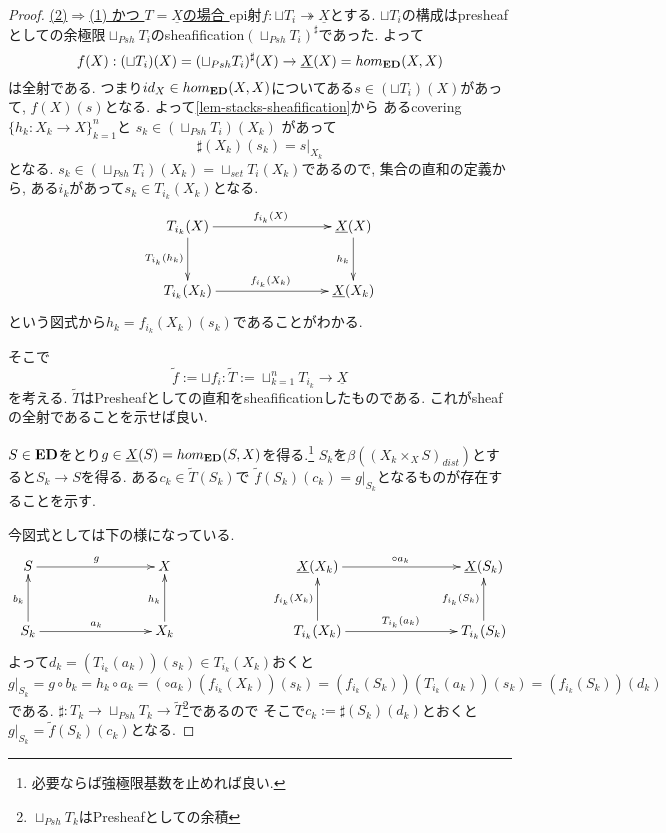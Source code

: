 \documentclass[dvipdfmx,a4paper,11pt]{article}
\theoremstyle{definition}
\begin{document}
\begin{proof}
\underline{(2)$\Rightarrow$(1) かつ $T = \underline{X}$の場合 }
epi射$f : \sqcup T_i \twoheadrightarrow \underline{X}$とする.
$\sqcup T_i $の構成はpresheafとしての余極限$\sqcup_{Psh} T_i $のsheafification$(\sqcup_{Psh} T_i )^{\sharp}$であった.
よって
$$
f(X) : (\sqcup T_i)(X) = (\sqcup_{Psh} T_i )^{\sharp}(X) \to \underline{X}(X)=hom_{{\bf ED}}(X,X)
$$ 
は全射である. 
つまり$id_{X} \in  hom_{{\bf ED}}(X,X)$についてある$s \in (\sqcup T_i)(X)$があって, $f(X)(s)$となる.
よって\ref{lem-stacks-sheafification}から
あるcovering$\{h_k : X_k \to X\}_{k=1}^{n}$と
$s_k \in (\sqcup_{Psh} T_i )(X_k)$
があって
$$
\sharp(X_k)(s_k)= s|_{X_k}
$$
となる. 
$s_k \in (\sqcup_{Psh} T_i) (X_k) = \sqcup_{set} T_{i}(X_k)$であるので, 
集合の直和の定義から, 
ある$i_k$があって$s_k \in T_{i_k}(X_k)$となる. 
\begin{equation*}
\xymatrix@C=80pt@R=30pt{
T_{i_k}(X)\ar@{->}[r]^{f_{i_k}(X)}\ar@{->}[d]_{T_{i_k}(h_k)}
&\underline{X}(X) \ar@{->}[d]_{h_k} \\
T_{i_k}(X_k) \ar@{->}[r]^{f_{i_k}(X_k)}
&\underline{X}(X_k) \\   
}
\end{equation*}
という図式から$h_{k} = f_{i_k}(X_k)(s_k)$であることがわかる. 

そこで
$$
\widetilde{f}:=\sqcup f_i : \widetilde{T}:=\sqcup_{k=1}^{n} T_{i_k} \to \underline{X}
$$
を考える. $\widetilde{T}$はPresheafとしての直和をsheafificationしたものである.
これがsheafの全射であることを示せば良い.

$S \in {\bf ED}$をとり$g \in \underline{X}(S) = hom_{{\bf ED}}(S,X)$を得る.\footnote{必要ならば強極限基数を止めれば良い.}
$S_k$を$\beta((X_{k} \times_{X} S)_{dist})$とすると$S_k \to S$を得る.
ある$c_k \in \widetilde{T}(S_k)$で
$\widetilde{f}(S_k)(c_k) = g|_{S_k}$となるものが存在することを示す.

今図式としては下の様になっている. 
\begin{equation*}
\xymatrix@C=80pt@R=30pt{
S \ar@{->}[r]^{g}
&X
&
\underline{X}(X_k) \ar@{->}[r]^{\circ a_k}
&\underline{X}(S_k) \\
S_k \ar@{->}[r]^{a_k} \ar@{->}[u]^{b_k}
&X_k \ar@{->}[u]^{h_k}
&
T_{i_k}(X_k) \ar@{->}[r]^{T_{i_k}(a_k)} \ar@{->}[u]^{f_{i_k}(X_k)}
&T_{i_k}(S_k) \ar@{->}[u]^{f_{i_k}(S_k)}\\   
}
\end{equation*}
よって$d_k =(T_{i_k}(a_k))(s_k) \in T_{i_k}(X_k)$おくと
$$
g|_{S_{k}}
=
g \circ b_k
=
h_k \circ a_{k}
=(\circ a_k)(f_{i_k}(X_k))(s_k)
=
(f_{i_k}(S_k))(T_{i_k}(a_k))(s_k)
= (f_{i_k}(S_k))(d_k)
$$
である. $\sharp :T_k \to \sqcup_{Psh} T_{k} \to \widetilde{T}$\footnote{$\sqcup_{Psh} T_{k} $はPresheafとしての余積}であるので
そこで$c_k:=\sharp(S_k)(d_k)$とおくと
$g|_{S_{k}} = \widetilde{f}(S_k)(c_k)$となる. 


\end{proof}
\end{document}
